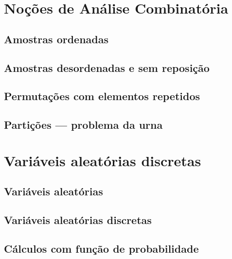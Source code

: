 \documentclass[../Notas.tex]{subfiles}
\begin{document}

\section{Noções de Análise Combinatória}

\subsection{Amostras ordenadas}

\subsection{Amostras desordenadas e sem reposição}

\subsection{Permutações com elementos repetidos}

\subsection{Partições --- problema da urna}


\section{Variáveis aleatórias discretas}

\subsection{Variáveis aleatórias}

\subsection{Variáveis aleatórias discretas}

\subsection{Cálculos com função de probabilidade}
\end{document}
